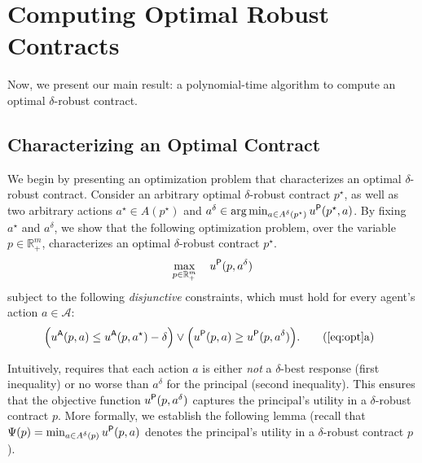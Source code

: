 \section{Computing Optimal Robust Contracts}\label{sec:computational_problem}



Now, we present our main result: a polynomial-time algorithm to compute an optimal $\delta$-robust contract.
%
%



\subsection{Characterizing an Optimal Contract}

We begin by presenting an optimization problem that characterizes an optimal $\delta$-robust contract. 
Consider an arbitrary optimal $\delta$-robust contract $p^\star$, as well as two arbitrary actions $a^\star \in A(p^\star)$ and $a^\delta \in \arg\min_{a \in A^\delta(p^\star)} u^{\mathsf{P}}(p^\star, a)$.
By fixing $a^\star$ and $a^\delta$, we show that the following optimization problem, over the variable $p \in \mathbb{R}_+^m$, characterizes an optimal $\delta$-robust contract $p^\star$.
\begin{align}
	\label{eq:opt}
	\max_{p\in  \mathbb{R}_+^m}
	\quad  
	u^{\mathsf{P}}(p, a^\delta)
\end{align}
subject to the following \emph{disjunctive} constraints, which must hold for every agent's action $a \in \mathcal{A}$:
\begin{align}
	\hspace{-2mm}\Big( u^\sfA(p, a) \le u^\sfA(p, a^\star) -   \delta  \Big) \vee \Big(u^\sfP(p, a) \ge u^\sfP(p, a^\delta)\Big).\tag{\ref*{eq:opt}a}\label{eq:opt-1}
\end{align}


Intuitively,  requires that each action $a$ is either \emph{not} a $\delta$-best response (first inequality) or no worse than $a^\delta$ for the principal (second inequality). This ensures that the objective function $u^{\mathsf{P}}(p,a^\delta)$ captures the principal's utility in a $\delta$-robust contract $p$.
More formally, we establish the following lemma (recall that $\Psi(p) = \min_{a \in A^\delta(p)} u^{\mathsf{P}}(p, a)$ denotes the principal's utility in a $\delta$-robust contract $p$).


